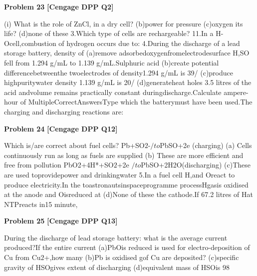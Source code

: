 \begin{problembox}
\textbf{Problem 23} \hfill \textbf{[Cengage DPP Q2]}
\label{q:ext-cng_dpp_all_questions-23}

(i) What is the role of ZnCl, in a dry cell?
(b)power for pressure
(c)oxygen
its life?
(d)none of these
3.Which type of cells are rechargeable?
11.In a H-Ocell,combustion of hydrogen occurs due to:
4.During the discharge of a lead storage battery, density of
(a)remove adsorbedoxygenfromelectrodesurface
H,SO fell from 1.294 g/mL to 1.139 g/mL.Sulphuric acid
(b)create potential differencebetweenthe twoelectrodes
of density1.294 g/mL is 39/%
(c)produce highpuritywater
density 1.139 g/mL is 20/%
(d)generateheat
holes 3.5 litres of the acid andvolume remains practically
constant duringdischarge.Calculate ampere-hour of
MultipleCorrectAnswersType
which the batterymust have been used.The charging and
discharging reactions are:
\end{problembox}

\begin{problembox}
\textbf{Problem 24} \hfill \textbf{[Cengage DPP Q12]}
\label{q:ext-cng_dpp_all_questions-24}

Which is/are correct about fuel cells?
Pb+SO$2$-$/to$PbSO+2e
(charging)
(a) Cells continuously run as long as fuels are supplied
(b) These are more efficient and free from pollution
PbO2+4H*+SO$2$+2e $/to$PbSO+2H2O(discharging)
(c)These are used toprovidepower and drinkingwater
5.In a fuel cell H,and Oreact to produce electricity.In the
toastronautsinspaceprogramme
processHgasis oxidised at the anode and Oisreduced at
(d)None of these
the cathode.If 67.2 litres of Hat NTPreacts in15 minute,
\end{problembox}

\begin{problembox}
\textbf{Problem 25} \hfill \textbf{[Cengage DPP Q13]}
\label{q:ext-cng_dpp_all_questions-25}

During the discharge of lead storage battery:
what is the average current produced?If the entire current
(a)PbOis reduced
is used for electro-deposition of Cu from Cu$2$+,how many
(b)Pb is oxidised
gof Cu are deposited?
(c)specific gravity of HSOgives extent of discharging
(d)equivalent mass of HSOis 98
\end{problembox}

